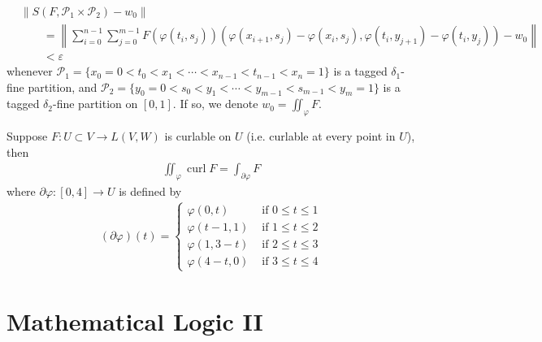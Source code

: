 \documentclass{treatise}
\begin{document}
\begin{shaded}
\begin{align*}
& \left \lVert S(F, \mathcal{P}_1 \times \mathcal{P}_2) -  w_0 \right\rVert
\\
& \qquad = \left \lVert \sum_{i = 0}^{n - 1} \sum_{j = 0}^{m - 1} F(\varphi(t_i, s_j))(\varphi(x_{i + 1}, s_j) - \varphi(x_{i}, s_j), \varphi(t_i, y_{j + 1}) - \varphi(t_i, y_{j}))  - w_0 \right\rVert
\\
& \qquad < \varepsilon
\end{align*}
whenever $\mathcal{P}_1 = \{ x_0 = 0 < t_0 < x_1 < \cdots < x_{n - 1} < t_{n - 1} < x_n = 1 \}$ is a tagged $\delta_1$-fine partition, and $\mathcal{P}_2 = \{ y_0 = 0 < s_0 < y_1 < \cdots < y_{m - 1} < s_{m - 1} < y_m = 1 \}$ is a tagged $\delta_2$-fine partition on $[0, 1]$. If so, we denote $w_0 = \iint_\varphi F$.
\begin{theorem}
Suppose $F: U \subset V \to L(V, W)$ is curlable on $U$ (i.e. curlable at every point in $U$), then
\begin{align*}
\iint_\varphi \operatorname{curl} F = \int_{\partial\varphi} F
\end{align*}
where $\partial \varphi: [0, 4] \to U$  is defined by
\begin{align*}
(\partial \varphi) (t) = \begin{cases}
    \varphi(0, t) & \mbox{ if } 0 \leq t \leq 1 \\
    \varphi(t - 1, 1) & \mbox{ if } 1 \leq t \leq 2 \\
    \varphi(1, 3 - t) & \mbox{ if } 2 \leq t \leq 3 \\
    \varphi(4 - t, 0) & \mbox{ if } 3 \leq t \leq 4
\end{cases}
\end{align*}
\end{theorem}


\newpage
\newpage

\chapter{Mathematical Logic II}

\end{shaded}
\end{document}
